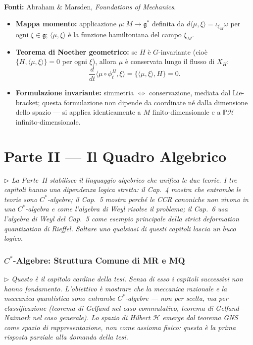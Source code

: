 \documentclass[12pt, a4paper]{article}
\newcommand{\fonti}[1]{%
	\begin{fontebox}
		\textcolor{fontecolor}{\footnotesize\textbf{Fonti:} #1}
	\end{fontebox}%
}
\newcommand{\nota}[1]{%
	\par\smallskip
	\noindent\textit{\small $\triangleright$\; #1}
	\par\smallskip
}
\begin{document}
	\fonti{Abraham \& Marsden, \textit{Foundations of Mechanics}.}
	
	\begin{itemize}
		\item \textbf{Mappa momento:} applicazione $\mu: M \to \mathfrak{g}^*$ definita da
		$d\langle\mu, \xi\rangle = \iota_{\xi_M}\omega$ per ogni $\xi \in \mathfrak{g}$;
		$\langle\mu, \xi\rangle$ è la funzione hamiltoniana del campo $\xi_M$.
		\item \textbf{Teorema di Noether geometrico:} se $H$ è $G$-invariante (cioè
		$\{H, \langle\mu, \xi\rangle\} = 0$ per ogni $\xi$), allora $\mu$ è conservata
		lungo il flusso di $X_H$:
		\[
		\frac{d}{dt}\langle\mu \circ \phi_t^H, \xi\rangle = \{\langle\mu,\xi\rangle, H\} = 0.
		\]
		\item \textbf{Formulazione invariante:} simmetria $\Leftrightarrow$ conservazione,
		mediata dal Lie-bracket; questa formulazione non dipende da coordinate né dalla
		dimensione dello spazio --- si applica identicamente a $M$ finito-dimensionale e
		a $\mathbb{P}\mathcal{H}$ infinito-dimensionale.
	\end{itemize}
	
	\newpage
	\part*{Parte II --- Il Quadro Algebrico}
	
	\nota{La Parte~II stabilisce il linguaggio algebrico che unifica le due teorie.
		I tre capitoli hanno una dipendenza logica stretta: il Cap.\ 4 mostra che entrambe
		le teorie sono $C^*$-algebre; il Cap.\ 5 mostra perché le CCR canoniche non
		vivono in una $C^*$-algebra e come l'algebra di Weyl risolve il problema;
		il Cap.\ 6 usa l'algebra di Weyl del Cap.\ 5 come esempio principale della
		strict deformation quantization di Rieffel. Saltare uno qualsiasi di questi
		capitoli lascia un buco logico.}
	
	\newpage
	\section{$C^*$-Algebre: Struttura Comune di MR e MQ}
	
	\nota{Questo è il capitolo cardine della tesi. Senza di esso i capitoli successivi
		non hanno fondamento. L'obiettivo è mostrare che la meccanica razionale e la meccanica
		quantistica sono entrambe $C^*$-algebre --- non per scelta, ma per classificazione
		(teorema di Gelfand nel caso commutativo, teorema di Gelfand--Naimark nel caso
		generale). Lo spazio di Hilbert $\mathcal{H}$ emerge dal teorema GNS come spazio
		di rappresentazione, non come assioma fisico: questa è la prima risposta parziale
		alla domanda della tesi.}
	
\end{document}
